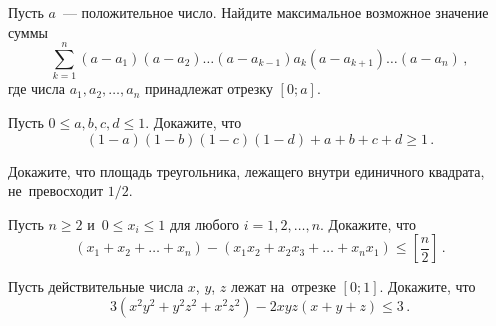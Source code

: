 



\begin{problems}


Пусть $a$~--- положительное число.
Найдите максимальное возможное значение суммы
\[
    \sum_{k = 1}^{n}
        (a - a_{1}) (a - a_{2})
        \ldots
        (a - a_{k-1}) a_{k} (a - a_{k+1})
        \ldots
        (a - a_{n})
\, , \]
где числа $a_{1}, a_{2}, \ldots, a_{n}$ принадлежат отрезку $[0; a]$.

\item
Пусть $0 \leq a, b, c, d \leq 1$.
Докажите, что
\[
    (1 - a) (1 - b) (1 - c) (1 - d) + a + b + c + d
\geq
    1
\, . \]

\item
Докажите, что площадь треугольника, лежащего внутри единичного квадрата,
не~превосходит $1/2$.

\item
Пусть $n \geq 2$ и~$0 \leq x_{i} \leq 1$ для любого $i = 1, 2, \ldots, n$.
Докажите, что
\[
    (x_{1} + x_{2} + \ldots + x_{n})
    - (x_{1} x_{2} + x_{2} x_{3} + \ldots + x_{n} x_{1})
\leq
    \left[ \frac{n}{2} \right]
\, . \]


\item
Пусть действительные числа $x$, $y$, $z$ лежат на~отрезке $[0; 1]$.
Докажите, что
\[
    3 (x^2 y^2 + y^2 z^2 + x^2 z^2) - 2 x y z (x + y + z)
\leq
    3
\, . \]



\end{problems}
